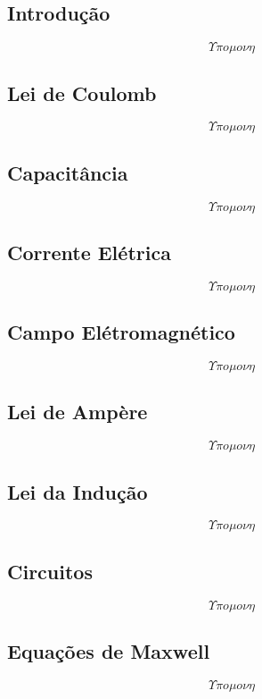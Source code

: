 \subsection{Introdução}
    \[ \Upsilon \pi o \mu o \nu \eta \]
\subsection{Lei de Coulomb}
    \[ \Upsilon \pi o \mu o \nu \eta \]
\subsection{Capacitância}
    \[ \Upsilon \pi o \mu o \nu \eta \]
\subsection{Corrente Elétrica}
    \[ \Upsilon \pi o \mu o \nu \eta \]
\subsection{Campo Elétromagnético}
    \[ \Upsilon \pi o \mu o \nu \eta \]
\subsection{Lei de Ampère}
    \[ \Upsilon \pi o \mu o \nu \eta \]
\subsection{Lei da Indução}
    \[ \Upsilon \pi o \mu o \nu \eta \]
\subsection{Circuitos}
    \[ \Upsilon \pi o \mu o \nu \eta \]
\subsection{Equações de Maxwell}
    \[ \Upsilon \pi o \mu o \nu \eta \]